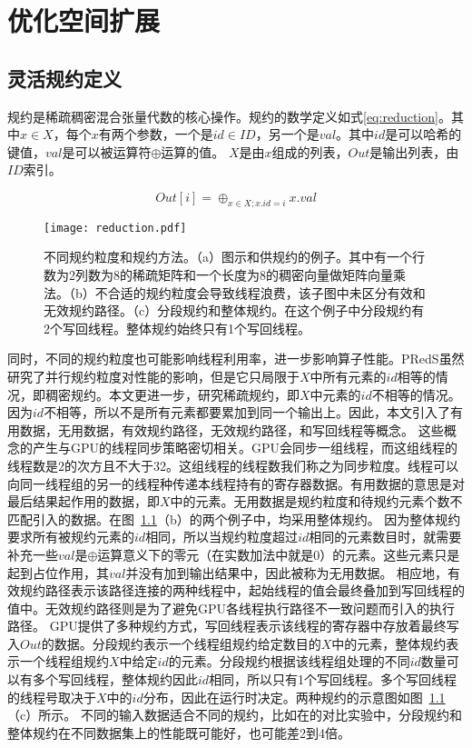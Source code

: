 
\chapter{优化空间扩展}

\section{灵活规约定义}
规约是稀疏稠密混合张量代数的核心操作。规约的数学定义如式\eqref{eq:reduction}。其中$x \in X$，每个$x$有两个参数，一个是$id\in ID$，另一个是$val$。其中$id$是可以哈希的键值，$val$是可以被运算符$\oplus$运算的值。
$X$是由$x$组成的列表，$Out$是输出列表，由$ID$索引。

\begin{equation}
  Out[i] = \oplus_{x\in X;x.id=i} x.val
  \label{eq:reduction}
\end{equation}
\begin{figure}[h]%
  \centering
  \texttt{[image: reduction.pdf]}
  \caption{不同规约粒度和规约方法。（a）图示和供规约的例子。其中有一个行数为2列数为8的稀疏矩阵和一个长度为8的稠密向量做矩阵向量乘法。（b）不合适的规约粒度会导致线程浪费，该子图中未区分有效和无效规约路径。（c）分段规约和整体规约。在这个例子中分段规约有2个写回线程。整体规约始终只有1个写回线程。}
  \label{fig:reductions}
\end{figure}
同时，不同的规约粒度也可能影响线程利用率，进一步影响算子性能。PRedS\cite{yu2021exploiting}虽然研究了并行规约粒度对性能的影响，但是它只局限于$X$中所有元素的$id$相等的情况，即稠密规约。本文更进一步，研究稀疏规约，即$X$中元素的$id$不相等的情况。
因为$id$不相等，所以不是所有元素都要累加到同一个输出上。因此，本文引入了有用数据，无用数据，有效规约路径，无效规约路径，和写回线程等概念。
这些概念的产生与GPU的线程同步策略密切相关。GPU会同步一组线程，而这组线程的线程数是2的次方且不大于32。这组线程的线程数我们称之为同步粒度。线程可以向同一线程组的另一的线程种传递本线程持有的寄存器数据。有用数据的意思是对最后结果起作用的数据，即$X$中的元素。无用数据是规约粒度和待规约元素个数不匹配引入的数据。在图~\ref{fig:reductions}（b）的两个例子中，均采用整体规约。
因为整体规约要求所有被规约元素的$id$相同，所以当规约粒度超过$id$相同的元素数目时，就需要补充一些$val$是$\oplus$运算意义下的零元（在实数加法中就是0）的元素。这些元素只是起到占位作用，其$val$并没有加到输出结果中，因此被称为无用数据。
相应地，有效规约路径表示该路径连接的两种线程中，起始线程的值会最终叠加到写回线程的值中。无效规约路径则是为了避免GPU各线程执行路径不一致问题而引入的执行路径。
GPU提供了多种规约方式，写回线程表示该线程的寄存器中存放着最终写入$Out$的数据。分段规约表示一个线程组规约给定数目的$X$中的元素，整体规约表示一个线程组规约$X$中给定$id$的元素。分段规约根据该线程组处理的不同$id$数量可以有多个写回线程，整体规约因此$id$相同，所以只有1个写回线程。多个写回线程的线程号取决于$X$中的$id$分布，因此在运行时决定。两种规约的示意图如图~\ref{fig:reductions}（c）所示。
不同的输入数据适合不同的规约，比如在\cite{dai2022heuristic}的对比实验中，分段规约和整体规约在不同数据集上的性能既可能好，也可能差2到4倍。

